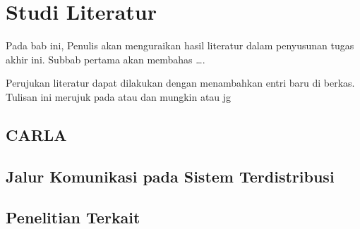 \chapter{Studi Literatur}


Pada bab ini, Penulis akan menguraikan hasil literatur dalam penyusunan tugas
akhir ini. Subbab pertama akan membahas \dots .

Perujukan literatur dapat dilakukan dengan menambahkan entri baru di berkas.
Tulisan ini merujuk pada \parencite{knuth2001art,vasp1} atau
\parencite{4026885} dan \parencite{Kim2006} mungkin atau jg \parencite{dov17carla}


\section{CARLA}
\blindtext

\section{Jalur Komunikasi pada Sistem Terdistribusi}
\blindtext

\section{Penelitian Terkait}
\blindtext

